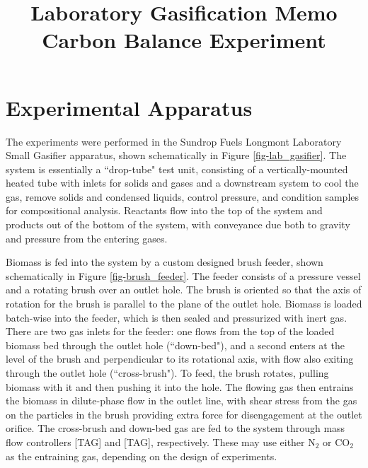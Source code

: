 \documentclass[11pt,twocolumn]{article}
\date{}
\title{Laboratory Gasification Memo\\Carbon Balance Experiment \vspace{-6ex}}
\begin{document}
\twocolumn[
  \begin{@twocolumnfalse}
    \maketitle
    \begin{abstract}
    


    \end{abstract}
  \end{@twocolumnfalse}
]

\section*{Experimental Apparatus}
The experiments were performed in the Sundrop Fuels Longmont Laboratory Small Gasifier apparatus, shown schematically in Figure \ref{fig-lab_gasifier}.  The system is essentially a ``drop-tube" test unit, consisting of a vertically-mounted heated tube with inlets for solids and gases and a downstream system to cool the gas, remove solids and condensed liquids, control pressure, and condition samples for compositional analysis.  Reactants flow into the top of the system and products out of the bottom of the system, with conveyance due both to gravity and pressure from the entering gases.

Biomass is fed into the system by a custom designed brush feeder, shown schematically in Figure \ref{fig-brush_feeder}.  The feeder consists of a pressure vessel and a rotating brush over an outlet hole.  The brush is oriented so that the axis of rotation for the brush is parallel to the plane of the outlet hole.  Biomass is loaded batch-wise into the feeder, which is then sealed and pressurized with inert gas.  There are two gas inlets for the feeder: one flows from the top of the loaded biomass bed through the outlet hole (``down-bed"), and a second enters at the level of the brush and perpendicular to its rotational axis, with flow also exiting through the outlet hole (``cross-brush").  To feed, the brush rotates, pulling biomass with it and then pushing it into the hole.  The flowing gas then entrains the biomass in dilute-phase flow in the outlet line, with shear stress from the gas on the particles in the brush providing extra force for disengagement at the outlet orifice.  The cross-brush and down-bed gas are fed to the system through mass flow controllers [TAG] and [TAG], respectively.  These may use either N$_2$ or CO$_2$ as the entraining gas, depending on the design of experiments.
\end{document}

